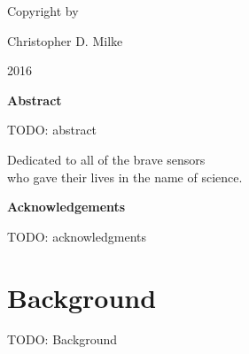 \documentclass{report}
\begin{document}
    \newpage \begin{center} 
        \vspace*{\fill}
        Copyright \textcopyright by

        Christopher D. Milke 

        2016
        \vspace*{\fill}
    \end{center} \newpage


        \begin{center} \LARGE \textbf{Abstract} \end{center}

        TODO: abstract

    \newpage


    \tableofcontents


    \newpage \vspace*{\fill}
        \begin{center} \begin{large}
            Dedicated to all of the brave sensors\\
            who gave their lives in the name of science.
        \end{large} \end{center}
    \vspace*{\fill} \newpage \vspace*{\fill}
        \begin{center} \begin{large}
            \large \textbf{Acknowledgements} \vspace{\baselineskip}

            TODO: acknowledgments

        \end{large} \end{center}
    \vspace*{\fill} \newpage





    \chapter{ Background }
         \setcounter{page}{1}
        TODO: Background
\end{document}
